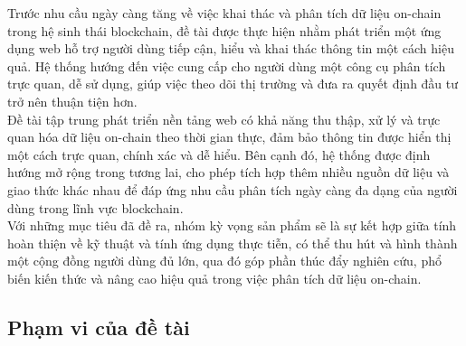 \documentclass{article}[14pt]
\begin{document}
{    %
   \hspace{0.3cm} Trước nhu cầu ngày càng tăng về việc khai thác và phân tích dữ liệu on-chain trong hệ sinh thái blockchain, đề tài được thực hiện nhằm phát triển một ứng dụng web hỗ trợ người dùng tiếp cận, hiểu và khai thác thông tin một cách hiệu quả. Hệ thống hướng đến việc cung cấp cho người dùng một công cụ phân tích trực quan, dễ sử dụng, giúp việc theo dõi thị trường và đưa ra quyết định đầu tư trở nên thuận tiện hơn.\\

    Đề tài tập trung phát triển nền tảng web có khả năng thu thập, xử lý và trực quan hóa dữ liệu on-chain theo thời gian thực, đảm bảo thông tin được hiển thị một cách trực quan, chính xác và dễ hiểu. Bên cạnh đó, hệ thống được định hướng mở rộng trong tương lai, cho phép tích hợp thêm nhiều nguồn dữ liệu và giao thức khác nhau để đáp ứng nhu cầu phân tích ngày càng đa dạng của người dùng trong lĩnh vực blockchain.\\
    
    Với những mục tiêu đã đề ra, nhóm kỳ vọng sản phẩm sẽ là sự kết hợp giữa tính hoàn thiện về kỹ thuật và tính ứng dụng thực tiễn, có thể thu hút và hình thành một cộng đồng người dùng đủ lớn, qua đó góp phần thúc đẩy nghiên cứu, phổ biến kiến thức và nâng cao hiệu quả trong việc phân tích dữ liệu on-chain.
    
    \subsection{Phạm vi của đề tài}

    
    
    

}
\end{document}
